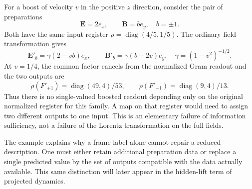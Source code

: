 For a boost of velocity $v$ in the positive $z$ direction, consider
the pair of preparations
\begin{equation}
 \boldsymbol E=2e_x,\qquad \boldsymbol B=b e_y,\quad b=\pm1.
\end{equation}
Both have the same input register $\rho=\operatorname{diag}(4/5,1/5)$.
The ordinary field transformation gives
\begin{equation}
 \boldsymbol E'_b=\gamma(2-vb)e_x,\qquad
 \boldsymbol B'_b=\gamma(b-2v)e_y,
 \quad \gamma=(1-v^2)^{-1/2}.
\end{equation}
At $v=1/4$, the common factor cancels from the normalized Gram
readout and the two outputs are
\begin{equation}
 \rho(F'_{+1})=\operatorname{diag}(49,4)/53,\qquad
 \rho(F'_{-1})=\operatorname{diag}(9,4)/13.
\end{equation}
Thus there is no single-valued boosted readout depending only on
the original normalized register for this family. A map on that
register would need to assign two different outputs to one input.
This is an elementary failure of information sufficiency, not a
failure of the Lorentz transformation on the full fields.

The example explains why a frame label alone cannot repair a reduced
description. One must either retain additional preparation data or
replace a single predicted value by the set of outputs compatible
with the data actually available. This same distinction will later
appear in the hidden-lift term of projected dynamics.

